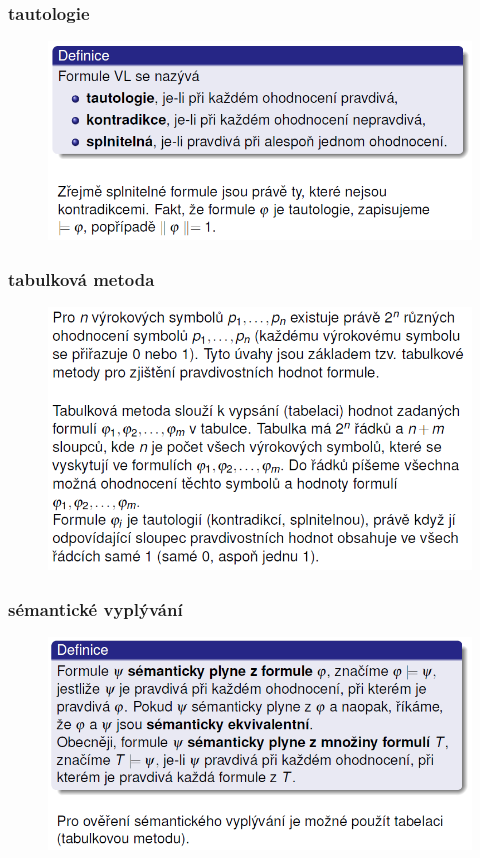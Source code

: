 \documentclass[10pt,a4paper]{article}
\theoremstyle{note}
\begin{document}
		\newpage
		\subsubsection{tautologie}

		\begin{figure}[!h]
			\centering
			\includegraphics[width=13cm]{img/tautologie.png}
			\end{figure}

		\subsubsection{tabulková metoda}
			\begin{figure}[!h]
			\centering
			\includegraphics[width=13cm]{img/tabulkovaMetoda.png}
			\end{figure}

		\newpage
		\subsubsection{sémantické vyplývání}

			\begin{figure}[!h]
			\centering
			\includegraphics[width=13cm]{img/semantickeVyplyvani.png}
			\end{figure}
\end{document}

